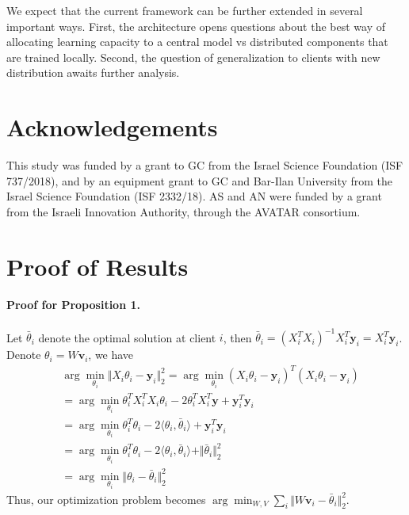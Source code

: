 \documentclass{article}
\newcommand{\bv}{\boldsymbol{v}}
\newcommand{\by}{\boldsymbol{y}}
\begin{document}
We expect that the current framework can be further extended in several important ways. First, the architecture opens questions about the best way of allocating learning capacity to a central model vs distributed components that are trained locally. Second, the question of generalization to clients with new distribution awaits further analysis. 











\nocite{langley00}

\section*{Acknowledgements}
This study was funded by a grant to GC from the Israel Science Foundation (ISF 737/2018), and by an equipment grant to GC and Bar-Ilan University from the Israel Science Foundation (ISF 2332/18). AS and AN were funded by a grant from the Israeli Innovation Authority, through the AVATAR consortium.





\clearpage
{}

\appendix



\section{Proof of Results}\label{app:theory}

\paragraph{Proof for Proposition 1.} Let $\bar{\theta}_i$ denote the optimal solution at client $i$, then $\bar{\theta}_i=(X_i^TX_i)^{-1}X_i^T\by_i=X_i^T\by_i$. Denote $\theta_i=W\bv_i$, we have 
\begin{align*}
    &\arg\min_{\theta_i}\Vert X_i\theta_i-\by_i\Vert_2^2 =\arg\min_{\theta_i}(X_i\theta_i-\by_i)^T(X_i\theta_i-\by_i)\\
    &=\arg\min_{\theta_i}\theta_i^TX_i^TX_i\theta_i-2\theta_i^TX_i^T\by+\by_i^T\by_i\\    
    &=\arg\min_{\theta_i}\theta_i^T\theta_i-2\langle\theta_i,\bar{\theta}_i\rangle+\by_i^T\by_i\\
    &=\arg\min_{\theta_i} \theta_i^T\theta_i-2\langle\theta_i,\bar{\theta}_i\rangle+\Vert\bar{\theta}_i\Vert_2^2\\&=\arg\min_{\theta_i} \Vert\theta_i-\bar{\theta}_i\Vert_2^2
\end{align*}
Thus, our optimization problem becomes $\arg\min_{W,V}\sum_i\Vert W\bv_i-\bar{\theta}_i\Vert_2^2$. 
\end{document}
